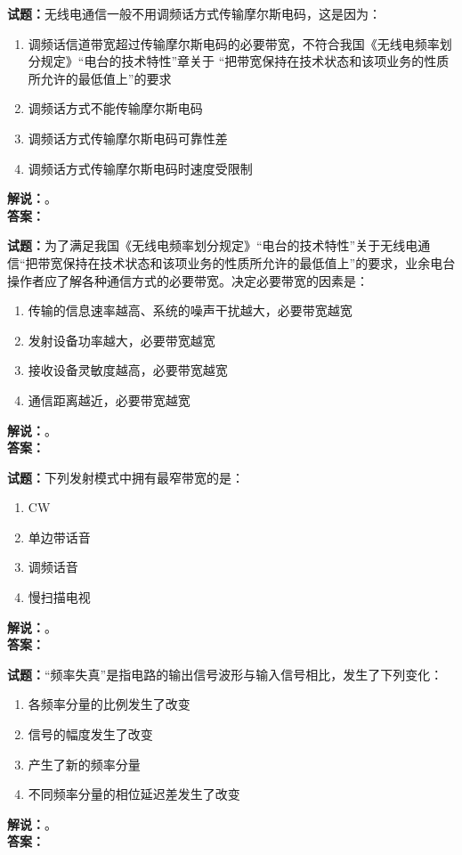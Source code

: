 \documentclass{ctexbook}
\begin{document}
\bigskip

\noindent\textbf{试题：}无线电通信一般不用调频话方式传输摩尔斯电码，这是因为：
\begin{enumerate}[leftmargin=3em]
  \item 调频话信道带宽超过传输摩尔斯电码的必要带宽，不符合我国《无线电频率划分规定》“电台的技术特性”章关于 “把带宽保持在技术状态和该项业务的性质所允许的最低值上”的要求
  \item 调频话方式不能传输摩尔斯电码
  \item 调频话方式传输摩尔斯电码可靠性差
  \item 调频话方式传输摩尔斯电码时速度受限制
\end{enumerate}
\noindent\textbf{解说：}\textbf{}。\\\noindent\textbf{答案：}

\bigskip

\noindent\textbf{试题：}为了满足我国《无线电频率划分规定》“电台的技术特性”关于无线电通信“把带宽保持在技术状态和该项业务的性质所允许的最低值上”的要求，业余电台操作者应了解各种通信方式的必要带宽。决定必要带宽的因素是：
\begin{enumerate}[leftmargin=3em]
  \item  传输的信息速率越高、系统的噪声干扰越大，必要带宽越宽
  \item  发射设备功率越大，必要带宽越宽
  \item  接收设备灵敏度越高，必要带宽越宽
  \item  通信距离越近，必要带宽越宽
\end{enumerate}
\noindent\textbf{解说：}\textbf{}。\\\noindent\textbf{答案：}

\bigskip

\noindent\textbf{试题：}下列发射模式中拥有最窄带宽的是：
\begin{enumerate}[leftmargin=3em]
  \item CW
  \item 单边带话音
  \item 调频话音
  \item 慢扫描电视
\end{enumerate}
\noindent\textbf{解说：}\textbf{}。\\\noindent\textbf{答案：}

\bigskip

\noindent\textbf{试题：}“频率失真”是指电路的输出信号波形与输入信号相比，发生了下列变化：
\begin{enumerate}[leftmargin=3em]
  \item 各频率分量的比例发生了改变
  \item 信号的幅度发生了改变
  \item 产生了新的频率分量
  \item 不同频率分量的相位延迟差发生了改变
\end{enumerate}
\noindent\textbf{解说：}\textbf{}。\\\noindent\textbf{答案：}
\end{document}
